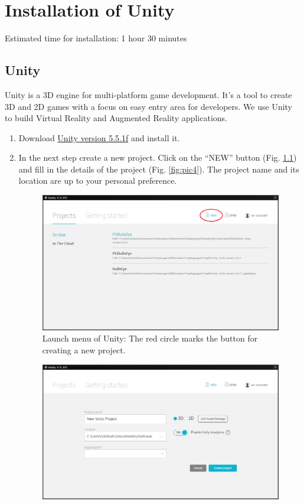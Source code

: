 \documentclass[../../Installationguide_Unity_Pupil]{subfiles}
\begin{document}
\chapter{Installation of Unity}
Estimated time for installation: 1 hour 30 minutes

\section{Unity}
Unity is a 3D engine for multi-platform game development. It's a tool to create 3D and 2D games with a focus on easy entry area for developers. We use Unity to build Virtual Reality and Augmented Reality applications.

\begin{enumerate}
	\item Download \href{https://unity3d.com/en/get-unity/download/archive}{Unity version 5.5.1f} and install it. 
	\item In the next step create a new project. Click on the ``NEW'' button (Fig. \ref{fig:pic3}) and fill in the details of the project (Fig. \ref{fig:pic4}). The project name and its location are up to your personal preference.
	\begin{figure}[htb]
		\centering
		\includegraphics[width=0.95\linewidth]{img/pic3}
		\caption{Launch menu of Unity: The red circle marks the button for creating a new project.}
		\label{fig:pic3}
	\end{figure}
\begin{figure}[htb]
	\centering
	\includegraphics[width=0.95\linewidth]{img/pic4}

\end{figure}
\end{enumerate}
\end{document}
